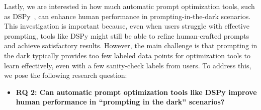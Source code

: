Lastly, we are interested in how much automatic prompt optimization tools, such as DSPy~\cite{khattab2023dspy}, can enhance human performance in prompting-in-the-dark scenarios. 
This investigation is important because, even when users struggle with effective prompting, tools like DSPy might still be able to refine human-crafted prompts and achieve satisfactory results.
However, 
the main challenge is that prompting in the dark typically provides too few labeled data points for optimization tools to learn effectively, even with a few sanity-check labels from users.
To address this, we pose the following research question:




\begin{itemize}
    \item \textbf{RQ 2: Can automatic prompt optimization tools like DSPy improve human performance in ``prompting in the dark'' scenarios?}
\end{itemize}



